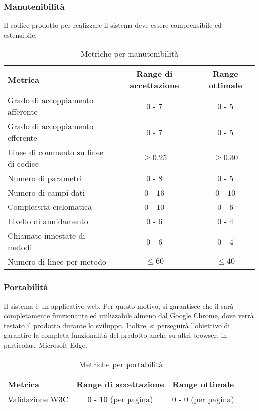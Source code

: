 \documentclass[../PianoDiQualifica.tex]{subfiles}
\begin{document}
			\subsubsection{Manutenibilità}
				Il codice prodotto per realizzare il sistema deve essere comprensibile
				ed estensibile.\\
				\begin{table}[H]
				\center
					\begin{tabular}{|l|c|c|}
						\hline
						\rowcolor{blue!30}\textbf{Metrica} & \textbf{Range di accettazione} & \textbf{Range ottimale}\\ \hline
						Grado di accoppiamento afferente & $0$ - $7$ & $0$ - $5$ \\ \hline
						Grado di accoppiamento efferente & $0$ - $7$ & $0$ - $5$ \\ \hline
						Linee di commento su linee di codice & $\geq 0.25$ & $\geq 0.30$ \\ \hline
						Numero di parametri & $0$ - $8$ & $0$ - $5$  \\ \hline
						Numero di campi dati & $0$ - $16$ & $0$ - $10$ \\ \hline
						Complessità ciclomatica & $0$ - $10$ & $0$ - $6$  \\ \hline
						Livello di annidamento & $0$ - $6$ & $0$ - $4$ \\ \hline
						Chiamate innestate di metodi & $0$ - $6$ & $0$ - $4$ \\ \hline
						Numero di linee per metodo & $\leq 60$ & $\leq 40$ \\ \hline
					\end{tabular}
					\caption{Metriche per manutenibilità}
				\end{table}
			\subsubsection{Portabilità}
				Il sistema è un applicativo web. Per questo motivo, si garantisce che
				il  sarà completamente funzionante ed utilizzabile
				almeno dal 	Google Chrome, dove verrà testato il prodotto
				durante lo sviluppo. Inoltre, si perseguirà l'obiettivo di garantire la
				completa funzionalità del prodotto anche su altri browser, in particolare Microsoft Edge.\\
				\begin{table}[H]
				\center
					\begin{tabular}{|l|c|c|}
						\hline
						\rowcolor{blue!30}\textbf{Metrica} & \textbf{Range di accettazione} & \textbf{Range ottimale}\\ \hline
						Validazione W3C & $0$ - $10$ (per pagina) & $0$ - $0$ (per pagina) \\ \hline
					\end{tabular}
					\caption{Metriche per portabilità}
				\end{table}
\end{document}
